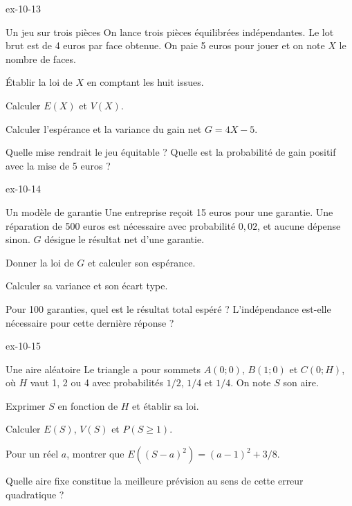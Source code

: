 \begin{blocLivre}{ex-10-13}
\begin{exercice}[3]{Un jeu sur trois pièces}
On lance trois pièces équilibrées indépendantes. Le lot brut est de 4 euros par face obtenue. On paie 5 euros pour jouer et on note $X$ le nombre de faces.\begin{questions}
\item Établir la loi de $X$ en comptant les huit issues.
\item Calculer $E(X)$ et $V(X)$.
\item Calculer l’espérance et la variance du gain net $G=4X-5$.
\item Quelle mise rendrait le jeu équitable ? Quelle est la probabilité de gain positif avec la mise de 5 euros ?
\end{questions}
\end{exercice}
\end{blocLivre}
\begin{blocLivre}{ex-10-14}
\begin{exercice}[3]{Un modèle de garantie}
Une entreprise reçoit 15 euros pour une garantie. Une réparation de 500 euros est nécessaire avec probabilité $0{,}02$, et aucune dépense sinon. $G$ désigne le résultat net d’une garantie.\begin{questions}
\item Donner la loi de $G$ et calculer son espérance.
\item Calculer sa variance et son écart type.
\item Pour 100 garanties, quel est le résultat total espéré ? L’indépendance est-elle nécessaire pour cette dernière réponse ?
\end{questions}
\end{exercice}
\end{blocLivre}
\begin{blocLivre}{ex-10-15}
\begin{exercice}[3]{Une aire aléatoire}
Le triangle a pour sommets $A(0;0)$, $B(1;0)$ et $C(0;H)$, où $H$ vaut 1, 2 ou 4 avec probabilités $1/2$, $1/4$ et $1/4$. On note $S$ son aire.\begin{questions}
\item Exprimer $S$ en fonction de $H$ et établir sa loi.
\item Calculer $E(S)$, $V(S)$ et $P(S\geq1)$.
\item Pour un réel $a$, montrer que $E((S-a)^2)=(a-1)^2+3/8$.
\item Quelle aire fixe constitue la meilleure prévision au sens de cette erreur quadratique ?
\end{questions}
\label{figlivre-r10-15-triangle-ex}

\end{exercice}
\end{blocLivre}
